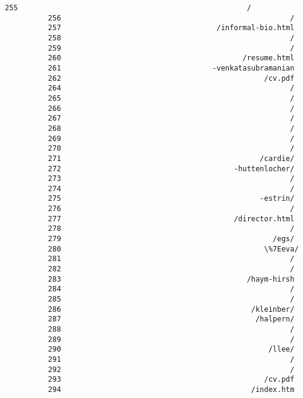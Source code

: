 \documentclass[11pt]{article}
\begin{document}
\begin{Verbatim}[commandchars=\\\{\}]
          255                                                     /
          256                                                     /
          257                                    /informal-bio.html
          258                                                     /
          259                                                     /
          260                                          /resume.html
          261                                   -venkatasubramanian
          262                                               /cv.pdf
          264                                                     /
          265                                                     /
          266                                                     /
          267                                                     /
          268                                                     /
          269                                                     /
          270                                                     /
          271                                              /cardie/
          272                                        -huttenlocher/
          273                                                     /
          274                                                     /
          275                                              -estrin/
          276                                                     /
          277                                        /director.html
          278                                                     /
          279                                                 /egs/
          280                                               \%7Eeva/
          281                                                     /
          282                                                     /
          283                                           /haym-hirsh
          284                                                     /
          285                                                     /
          286                                            /kleinber/
          287                                             /halpern/
          288                                                     /
          289                                                     /
          290                                                /llee/
          291                                                     /
          292                                                     /
          293                                               /cv.pdf
          294                                            /index.htm

\end{Verbatim}
\end{document}

